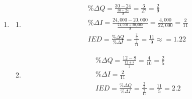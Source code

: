 \documentclass{article}
\begin{document}
\begin{enumerate}
\begin{enumerate}
\begin{enumerate}
		\end{enumerate}
	
	\item
	
		\begin{enumerate}
		
		\item
		\begin{gather*}
		\% \Delta Q = \frac{30 - 24}{\frac{30 + 24}{2}} = \frac{6}{27} = \frac{2}{9} \\
		\% \Delta I = \frac{24,000 - 20,000}{\frac{24,000 + 20,000}{2}} = \frac{4,000}{22,000} = \frac{2}{11} \\
		IED = \frac{\% \Delta Q}{\% \Delta I} = \frac{\frac{2}{9}}{\frac{2}{11}} = \frac{11}{9} \approx = 1.22
		\end{gather*}
		
		\item
		\begin{gather*}
		\% \Delta Q = \frac{12 - 8}{\frac{12 + 8}{2}} = \frac{4}{10} = \frac{2}{5} \\
		\% \Delta I = \frac{2}{11} \\
		IED = \frac{\% \Delta Q}{\% \Delta I} = \frac{\frac{2}{5}}{\frac{2}{11}} = \frac{11}{5} = 2.2
		\end{gather*}
		
		\end{enumerate}
	
	\end{enumerate}


\end{enumerate}
\end{document}
